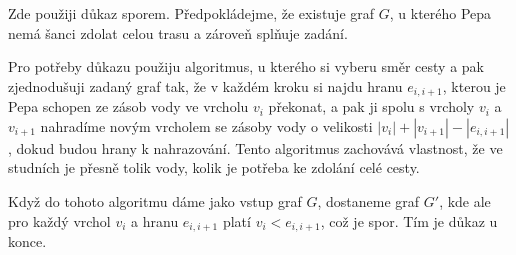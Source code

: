 \documentclass{fkssolpub}
\author{Ondřej Sedláček}
\begin{document}
Zde použiji důkaz sporem. Předpokládejme, že existuje graf $G$, u kterého
Pepa nemá šanci zdolat celou trasu a zároveň splňuje zadání.

Pro potřeby důkazu použiju algoritmus, u kterého si vyberu směr cesty a pak
zjednodušuji zadaný graf tak, že v každém kroku si najdu hranu
$e_{i,i+1}$, kterou je Pepa schopen ze
zásob vody ve vrcholu $v_i$ překonat, a pak ji spolu s vrcholy $v_i$ a $v_{i+1}$
nahradíme novým vrcholem se zásoby vody o velikosti $|v_i| + |v_{i+1}| - |e_{i,i+1}|$,
dokud budou hrany k nahrazování. Tento algoritmus zachovává vlastnost, že ve studních
je přesně tolik vody, kolik je potřeba ke zdolání celé cesty.

Když do tohoto algoritmu dáme jako vstup
graf $G$, dostaneme graf $G'$, kde ale pro každý vrchol $v_i$ a hranu
$e_{i,i+1}$ platí $v_i < e_{i, i+1}$, což je spor. Tím je důkaz u konce.
\end{document}
